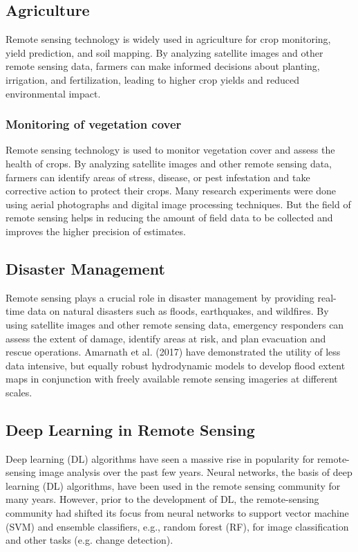 \documentclass[conference]{IEEEtran}
\begin{document}
\subsection{Agriculture}
Remote sensing technology is widely used in agriculture for crop monitoring, yield prediction, and soil mapping. By analyzing satellite images and other remote sensing data, farmers can make informed decisions about planting, irrigation, and fertilization, leading to higher crop yields and reduced environmental impact.

\subsubsection{Monitoring of vegetation cover}
Remote sensing technology is used to monitor vegetation cover and assess the health of crops. By analyzing satellite images and other remote sensing data, farmers can identify areas of stress, disease, or pest infestation and take corrective action to protect their crops. Many research experiments were done using aerial photographs and digital image processing techniques. But the field of remote sensing helps in reducing the amount of field data to be collected and improves the higher precision of estimates. \cite{shanmugapriya2019applications}

\subsection{Disaster Management}
Remote sensing plays a crucial role in disaster management by providing real-time data on natural disasters such as floods, earthquakes, and wildfires. By using satellite images and other remote sensing data, emergency responders can assess the extent of damage, identify areas at risk, and plan evacuation and rescue operations. Amarnath et al. (2017) have demonstrated the utility of less data intensive, but equally robust hydrodynamic models to develop flood extent maps in conjunction with freely available remote sensing imageries at different scales. \cite{Amarnath2024}

\subsection{Deep Learning in Remote Sensing}
Deep learning (DL) algorithms have seen a massive rise in popularity for remote-sensing image analysis over the past few years. Neural networks, the basis of deep learning (DL) algorithms, have been used in the remote sensing community for many years. However, prior to the development of DL, the remote-sensing community had shifted its focus from neural networks to support vector machine (SVM) and ensemble classifiers, e.g., random forest (RF), for image classification and other tasks (e.g. change detection). \cite{MA2019166} 
\end{document}
